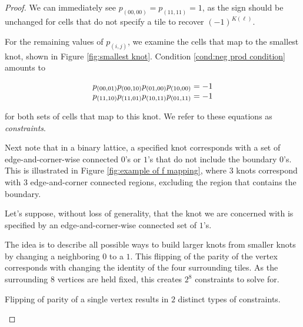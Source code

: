 \documentclass[12pt]{article}
\theoremstyle{plain}
\theoremstyle{definition}
\theoremstyle{remark}
\theoremstyle{definition}
\begin{document}
\begin{proof}

We can immediately see $p_{(00,00)} = p_{(11,11)} = 1$, as the sign should be unchanged for cells that do not specify a tile to recover $(-1)^{K(\ell)}$.

For the remaining values of $p_{(i,j)}$, we examine the cells that map to the smallest knot, shown in Figure \ref{fig:smallest knot}. Condition \ref{cond:neg prod condition} amounts to

\begin{equation}
    \begin{array}{r@{}l}
        p_{(00,01)} p_{(00,10)} p_{(01,00)} p_{(10,00)} &{} = -1 \\
        p_{(11,10)} p_{(11,01)} p_{(10,11)} p_{(01,11)} &{} = -1
    \end{array}
    \label{eq:small sap constraint}
\end{equation}

for both sets of cells that map to this knot. We refer to these equations as \textit{constraints}. 

Next note that in a binary lattice, a specified knot corresponds with a set of edge-and-corner-wise connected $0$'s or $1$'s that do not include the boundary $0$'s. This is illustrated in Figure \ref{fig:example of f mapping}, where $3$ knots correspond with $3$ edge-and-corner connected regions, excluding the region that contains the boundary. 

Let's suppose, without loss of generality, that the knot we are concerned with is specified by an edge-and-corner-wise connected set of $1$'s.

The idea is to describe all possible ways to build larger knots from smaller knots by changing a neighboring $0$ to a $1$. This flipping of the parity of the vertex corresponds with changing the identity of the four surrounding tiles. As the surrounding $8$ vertices are held fixed, this creates $2^8$ constraints to solve for. 

Flipping of parity of a single vertex results in $2$ distinct types of constraints. 

\begin{figure}[h!]
    \begin{center}


\end{center}
\end{figure}
\end{proof}
\end{document}

